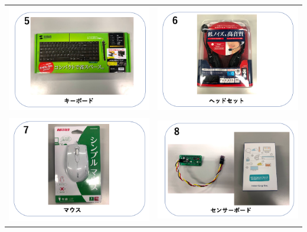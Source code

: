 \documentclass[a4paper,12pt]{jarticle}
\begin{document}
\begin{tabular}{cc}
  \includegraphics[width=6.488cm,height=4.697cm]{textbook-img005.png}
   &
  \includegraphics[width=6.488cm,height=4.697cm]{textbook-img006.png} \\

  \includegraphics[width=6.488cm,height=4.697cm]{textbook-img003.png}
   &
  \includegraphics[width=6.488cm,height=4.697cm]{textbook-img004.png} \\


\end{tabular}
\end{document}
